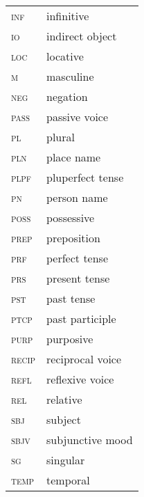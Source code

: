 \begin{refsection}
\begin{tabularx}{.45\textwidth}{ll}
\textsc{inf} & infinitive\\
\textsc{io} & indirect object\\
\textsc{loc} & locative\\
\textsc{m} & masculine\\
\textsc{neg} & negation\\
\textsc{pass} & passive voice\\
\textsc{pl} & plural\\
\textsc{pln} & place name\\
\textsc{plpf} & pluperfect tense\\
\textsc{pn} & person name\\
\textsc{poss} & possessive\\
\textsc{prep} & preposition\\
\textsc{prf} & perfect tense\\
\textsc{prs} & present tense\\
\textsc{pst} & past tense\\
\textsc{ptcp} & past participle\\
\textsc{purp} & purposive\\
\textsc{recip} & reciprocal voice\\
\textsc{refl} & reflexive voice\\
\textsc{rel} & relative\\
\textsc{sbj} & subject\\
\textsc{sbjv} & subjunctive mood\\
\textsc{sg} & singular\\
\textsc{temp} & temporal\\
\end{tabularx}




\printbibliography[heading=subbibliography]
\end{refsection}